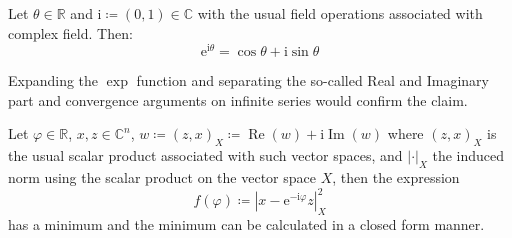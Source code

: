 	\begin{Thm}\label{theorem:euler formula}
    Let $\theta \in \mathbb{R}$ and $\mathrm{i} \coloneqq (0,1) \in \mathbb{C}$ with the usual field operations associated with 
	complex field. Then:
	\begin{equation*}
		\mathrm{e}^{\mathrm{i}\theta} = \cos \theta +  \mathrm{i}\sin \theta
	\end{equation*}
	\end{Thm}
	\begin{Proof}
		Expanding the $\exp$ function and separating the so-called Real and Imaginary part and convergence arguments 
	on infinite series would confirm the claim\cite{Rudin1987}\cite{Stein2003}. 
	\end{Proof}


	\begin{Prop}\label{theorem:min distance}
		Let $\varphi \in \mathbb{R}$, $x,z \in \mathbb{C}^n$, $w \coloneqq (z,x)_X \coloneqq \operatorname{Re}(w)+\mathrm{i}\operatorname{Im}(w)$ where $(z,x)_X$ is 
		the usual scalar product associated with such vector spaces, and $\left|\cdot\right|_X$ the induced norm using the scalar product on the vector space $X$, then the expression
		\begin{equation*}
			f(\varphi) \coloneqq \left|x-\mathrm{e}^{-\mathrm{i}\varphi}z\right|^2_X
		\end{equation*}
		has a minimum and the minimum can be calculated in a closed form manner.
		\end{Prop}
